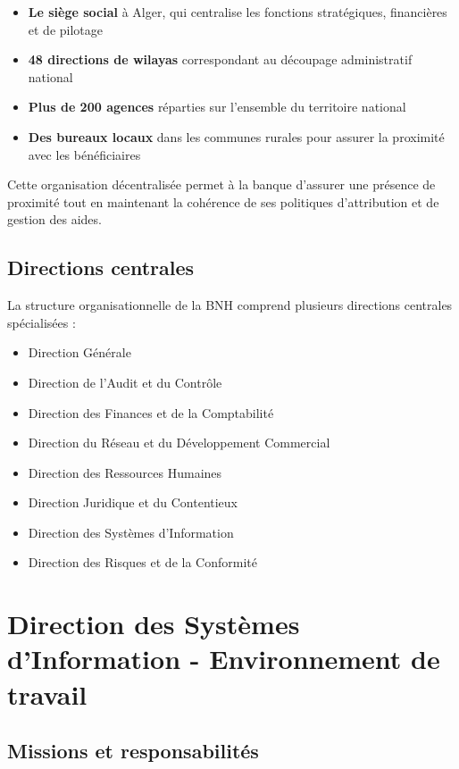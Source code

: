 \begin{itemize}
    \item \textbf{Le siège social} à Alger, qui centralise les fonctions stratégiques, financières et de pilotage
    \item \textbf{48 directions de wilayas} correspondant au découpage administratif national
    \item \textbf{Plus de 200 agences} réparties sur l'ensemble du territoire national
    \item \textbf{Des bureaux locaux} dans les communes rurales pour assurer la proximité avec les bénéficiaires
\end{itemize}

Cette organisation décentralisée permet à la banque d'assurer une présence de proximité tout en maintenant la cohérence de ses politiques d'attribution et de gestion des aides.

\subsection{Directions centrales}

La structure organisationnelle de la BNH comprend plusieurs directions centrales spécialisées :

\begin{itemize}
    \item Direction Générale
    \item Direction de l'Audit et du Contrôle
    \item Direction des Finances et de la Comptabilité
    \item Direction du Réseau et du Développement Commercial
    \item Direction des Ressources Humaines
    \item Direction Juridique et du Contentieux
    \item Direction des Systèmes d'Information
    \item Direction des Risques et de la Conformité
\end{itemize}

\section{Direction des Systèmes d'Information - Environnement de travail}

\subsection{Missions et responsabilités}

